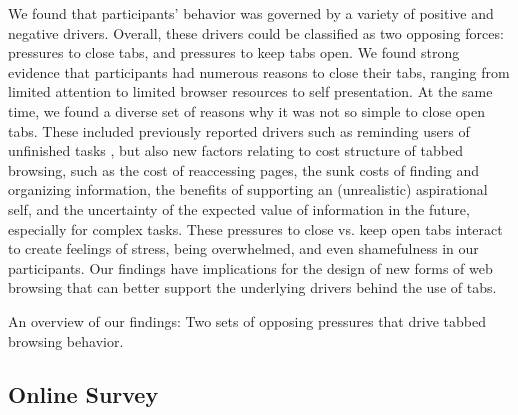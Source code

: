 We found that participants' behavior was governed by a variety of positive and negative drivers. Overall, these drivers could be classified as two opposing forces: pressures to close tabs, and pressures to keep tabs open.  We found strong evidence that participants had numerous reasons to close their tabs, ranging from limited attention to limited browser resources to self presentation.  At the same time, we found a diverse set of reasons why it was not so simple to close open tabs. These included previously reported drivers such as reminding users of unfinished tasks \cite{Dubroy:2010:STB:1753326.1753426}, but also new factors relating to cost structure of tabbed browsing, such as the cost of reaccessing pages, the sunk costs of finding and organizing information, the benefits of supporting an (unrealistic) aspirational self, and the uncertainty of the expected value of information in the future, especially for complex tasks. These pressures to close vs. keep open tabs interact to create feelings of stress, being overwhelmed, and even shamefulness in our participants. Our findings have implications for the design of new forms of web browsing that can better support the underlying drivers behind the use of tabs.

\begin{table*}
\centering
\footnotesize

  \caption[An overview of our findings in the tab usage study.]{An overview of our findings: Two sets of opposing pressures that drive tabbed browsing behavior.}
  \label{tab:overview}
\end{table*}



\subsection{Online Survey}

